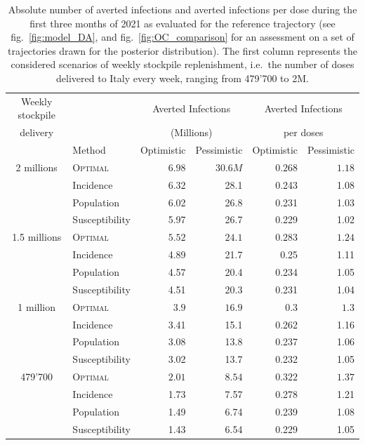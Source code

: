 \begin{table}[h!]
\centering
\begin{tabular}{clrrrr}
\toprule
Weekly stockpile& {} & \multicolumn{2}{c}{Averted Infections} & \multicolumn{2}{c}{Averted Infections} \\
delivery&  {}  &\multicolumn{2}{c}{(Millions)} & \multicolumn{2}{c}{ per doses} \\
& Method &  Optimistic & Pessimistic &     Optimistic & Pessimistic \\
\midrule
2 millions & \textsc{Optimal} &   $6.98$ &  $30.6M$ & $0.268$ & $1.18$ \\
        & Incidence &   6.32 &    28.1 &          0.243 &        1.08 \\
        & Population &   6.02 &    26.8 &          0.231 &        1.03 \\
        & Susceptibility &   5.97 &    26.7 &          0.229 &        1.02 \\
1.5 millions & \textsc{Optimal} &   $5.52$ &   $24.1$ &  $ 0.283$ & $1.24$ \\
        & Incidence &   4.89 &    21.7 &           0.25 &        1.11 \\
        & Population &   4.57 &    20.4 &          0.234 &        1.05 \\
        & Susceptibility &   4.51 &    20.3 &          0.231 &        1.04 \\
1 million & \textsc{Optimal} &    $3.9$ &    $16.9$ &  $0.3$ & $1.3$ \\
        & Incidence &   3.41 &    15.1 &          0.262 &        1.16 \\
        & Population &   3.08 &    13.8 &          0.237 &        1.06 \\
        & Susceptibility &   3.02 &    13.7 &          0.232 &        1.05 \\
479'700 & \textsc{Optimal} &  $2.01$ &  $8.54$ & $0.322$ & $1.37$ \\
        & Incidence &   1.73 &    7.57 &          0.278 &        1.21 \\
        & Population &   1.49 &    6.74 &          0.239 &        1.08 \\
        & Susceptibility &   1.43 &    6.54 &          0.229 &        1.05 \\
\bottomrule
\end{tabular}

\caption[Averted infections per dose for different allocation strategies]{Absolute number of averted infections and averted infections per dose during the first three months of 2021 as evaluated for the reference trajectory (see fig.~\ref{fig:model_DA}, and fig.~\ref{fig:OC_comparison} for an assessment on a set of trajectories drawn for the posterior distribution). The first column represents the considered scenarios of weekly stockpile replenishment, i.e.~the number of doses delivered to Italy every week, ranging from 479'700 to 2M.}
\label{table:averted_abs}
\end{table}
